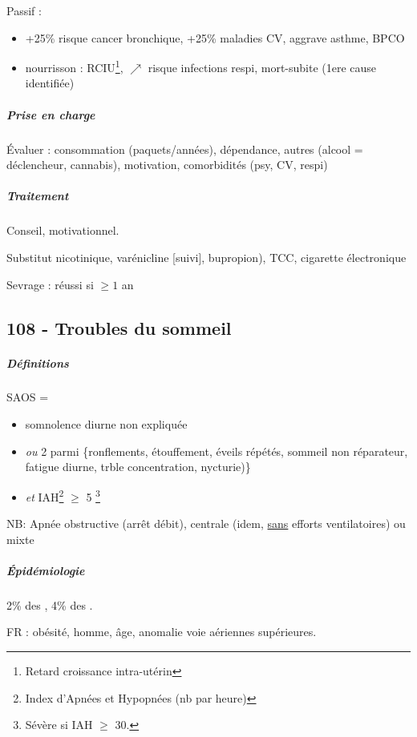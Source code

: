 \documentclass[11pt]{article}
\begin{document}
Passif :
\begin{itemize}
\item +25\% risque cancer bronchique, +25\% maladies CV, aggrave asthme, BPCO
\item nourrisson : RCIU\footnote{Retard croissance intra-utérin}, \(\nearrow\) risque
infections respi, mort-subite (1ere cause identifiée)
\end{itemize}

\subparagraph{Prise en charge}
\label{sec:org432b82d}
Évaluer : consommation (paquets/années), dépendance, autres (alcool = déclencheur,
cannabis), motivation, comorbidités (psy, CV, respi)
\subparagraph{Traitement}
\label{sec:org9184a24}
Conseil, motivationnel.

Substitut nicotinique, varénicline [\danger suivi], bupropion), TCC, cigarette électronique

Sevrage : réussi si \(\ge 1\) an

\subsection{108 - Troubles du sommeil}
\label{sec:orgca9fc5d}
\subparagraph{Définitions}
\label{sec:org7a10c07}
SAOS =
\begin{itemize}
\item somnolence diurne non expliquée
\item \emph{ou} 2 parmi \{ronflements, étouffement, éveils répétés, sommeil non réparateur, fatigue diurne, trble concentration, nycturie)\}
\item \emph{et} IAH\footnote{Index d'Apnées et Hypopnées (nb par heure)} \(\ge\) 5 \footnote{Sévère si IAH \(\ge\) 30.}
\end{itemize}
NB: Apnée obstructive (arrêt débit), centrale (idem, \uline{sans} efforts ventilatoires) ou mixte

\subparagraph{Épidémiologie}
\label{sec:org0d456d7}
2\% des \female, 4\% des \male.

FR : obésité, homme, âge, anomalie voie aériennes supérieures. 
\end{document}
